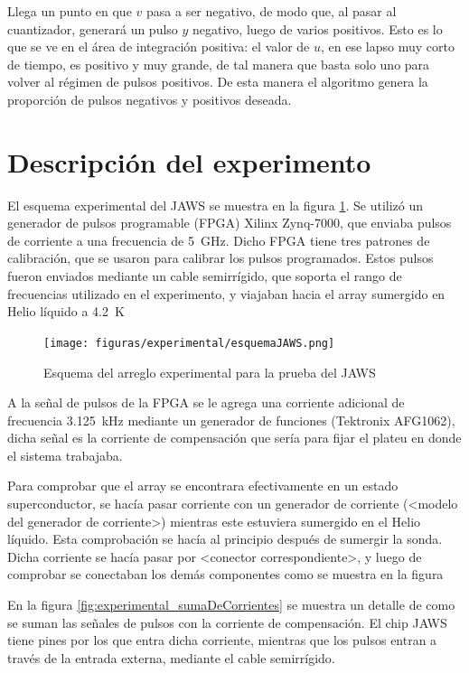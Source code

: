 \documentclass[twoside]{article}
\begin{document}
\begin{multicols}{2}
Llega un punto en que $v$ pasa a ser negativo, de modo que, al pasar al cuantizador, generará un pulso $y$ negativo, luego de varios positivos. Esto es lo que se ve en el área de integración positiva: el valor de $u$, en ese lapso muy corto de tiempo, es positivo y muy grande, de tal manera que basta solo uno para volver al régimen de pulsos positivos. De esta manera el algoritmo genera la proporción de pulsos negativos y positivos deseada.

\section{Descripción del experimento}

El esquema experimental del JAWS se muestra en la figura \ref{fig:experimental_esquemaJAWS}. Se utilizó un generador de pulsos programable (FPGA) Xilinx Zynq-7000, que enviaba pulsos de corriente a una frecuencia de \SI{5}{\giga\hertz}. Dicho FPGA tiene tres patrones de calibración, que se usaron para calibrar los pulsos programados. Estos pulsos fueron enviados mediante un cable semirrígido, que soporta el rango de frecuencias utilizado en el experimento, y viajaban hacia el array sumergido en Helio líquido a \SI{4.2}{\kelvin}

\begin{figure}[H]
    \centering
    \texttt{[image: figuras/experimental/esquemaJAWS.png]}
    \caption{Esquema del arreglo experimental para la prueba del JAWS}
    \label{fig:experimental_esquemaJAWS}
\end{figure}

A la señal de pulsos de la FPGA se le agrega una corriente adicional de frecuencia \SI{3.125}{\kilo\hertz} mediante un generador de funciones (Tektronix AFG1062), dicha señal es la corriente de compensación que sería para fijar el plateu en donde el sistema trabajaba.

Para comprobar que el array se encontrara efectivamente en un estado superconductor, se hacía pasar corriente con un generador de corriente (<modelo del generador de corriente>) mientras este estuviera sumergido en el Helio líquido. Esta comprobación se hacía al principio después de sumergir la sonda. Dicha corriente se hacía pasar por <conector correspondiente>, y luego de comprobar se conectaban los demás componentes como se muestra en la figura 

En la figura \ref{fig:experimental_sumaDeCorrientes} \cite{kieler2007} se muestra un detalle de como se suman las señales de pulsos con la corriente de compensación. El chip JAWS tiene pines por los que entra dicha corriente, mientras que los pulsos entran a través de la entrada externa, mediante el cable semirrígido.


\end{multicols}
\end{document}
